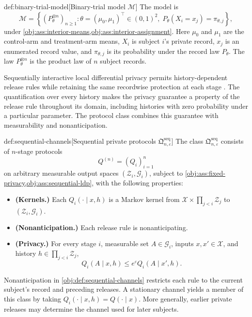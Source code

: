 \documentclass[11pt]{article}
\begin{document}
\begin{definitionv}{def:binary-trial-model}[Binary-trial model \(\mathcal M\)]
The model is
\[
\mathcal M
=
\left\{
(P_\theta^{\otimes n})_{n\ge1}:
\theta=(\mu_0,\mu_1)^{\top}\in(0,1)^2,\;
P_\theta(X_i=x_j)=\pi_{\theta,j}
\right\},
\]
under \cref{obj:ass:interior-means,obj:ass:interior-assignment}.
Here \(\mu_0\) and \(\mu_1\) are the control-arm and treatment-arm means, \(X_i\) is subject \(i\)'s private record, \(x_j\) is an enumerated record value, and \(\pi_{\theta,j}\) is its probability under the record law \(P_\theta\). The law \(P_\theta^{\otimes n}\) is the product law of \(n\) subject records.
\end{definitionv}

Sequentially interactive local differential privacy permits history-dependent release rules while retaining the same recordwise protection at each stage \citep{Steinberger2024}. The quantification over every history makes the privacy guarantee a property of the release rule throughout its domain, including histories with zero probability under a particular parameter. The protocol class  combines this guarantee with measurability and nonanticipation.

\begin{definitionv}{def:sequential-channels}[Sequential private protocols $\mathfrak Q^{\mathrm{seq}}_{n,\varepsilon}$]
The class \(\mathfrak Q^{\mathrm{seq}}_{n,\varepsilon}\) consists of \(n\)-stage protocols
\[
Q^{(n)}=(Q_i)_{i=1}^n
\]
on arbitrary measurable output spaces \((\mathcal Z_i,\mathcal G_i)\), subject to \cref{obj:ass:fixed-privacy,obj:ass:sequential-ldp}, with the following properties:
\begin{itemize}
\item \textbf{(Kernels.)} Each \(Q_i(\cdot\mid x,h)\) is a Markov kernel from \(\mathcal X\times\prod_{j<i}\mathcal Z_j\) to \((\mathcal Z_i,\mathcal G_i)\).
\item \textbf{(Nonanticipation.)} Each release rule is nonanticipating.
\item \textbf{(Privacy.)} For every stage \(i\), measurable set \(A\in\mathcal G_i\), inputs \(x,x'\in\mathcal X\), and history \(h\in\prod_{j<i}\mathcal Z_j\),
\[
Q_i(A\mid x,h)\le e^\varepsilon Q_i(A\mid x',h).
\]
\end{itemize}
\end{definitionv}

Nonanticipation in \cref{obj:def:sequential-channels} restricts each rule to the current subject's record and preceding releases. A stationary channel yields a member of this class by taking \(Q_i(\cdot\mid x,h)=Q(\cdot\mid x)\). More generally, earlier private releases may determine the channel used for later subjects.
\end{document}
